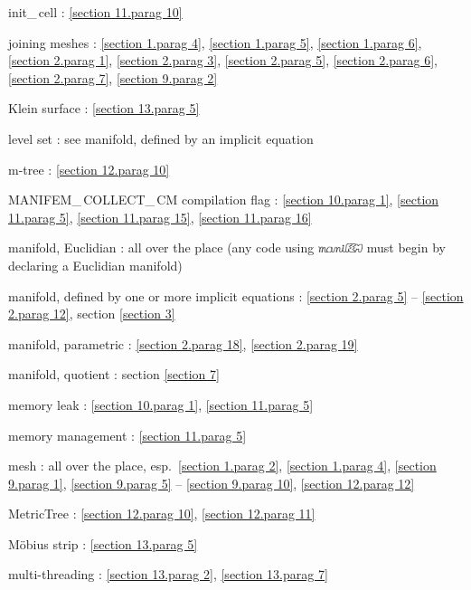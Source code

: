 \documentclass[a4paper]{scrreprt}
\def\numb{}
\newcommand\maniFEM{\leavevmode\hbox{\includegraphics[width=13mm]{manifem-small}}}
\newcommand\verm[1]{\textcolor{manif}{#1}}
\renewcommand\tt{\normalfont\ttfamily}
\begin{document}
\noindent
{\small\tt init\_\,cell} : \ref{\numb section 11.\numb parag 10}

\noindent
{\small\tt join}ing meshes : \ref{\numb section 1.\numb parag 4},
\ref{\numb section 1.\numb parag 5}, \ref{\numb section 1.\numb parag 6},
\ref{\numb section 2.\numb parag 1}, \ref{\numb section 2.\numb parag 3},
\ref{\numb section 2.\numb parag 5}, \ref{\numb section 2.\numb parag 6},
\ref{\numb section 2.\numb parag 7}, \ref{\numb section 9.\numb parag 2}

\noindent
Klein surface : \ref{\numb section 13.\numb parag 5}

\noindent
level set : see manifold, defined by an implicit equation

\noindent
m-tree : \ref{\numb section 12.\numb parag 10}

\noindent
{\small\tt MANIFEM\_\,COLLECT\_\,CM} compilation flag : \ref{\numb section 10.\numb parag 1},
\ref{\numb section 11.\numb parag 5}, \ref{\numb section 11.\numb parag 15},
\ref{\numb section 11.\numb parag 16}

\noindent
manifold, Euclidian : all over the place\hfil\break
\hglue 9mm (any code using {\maniFEM} must begin by declaring a Euclidian manifold)

\noindent
manifold, defined by one or more implicit equations :
\ref{\numb section 2.\numb parag 5} -- \ref{\numb section 2.\numb parag 12},
section \ref{\numb section 3}

\noindent
manifold, parametric : \ref{\numb section 2.\numb parag 18},
\ref{\numb section 2.\numb parag 19}

\noindent
manifold, quotient : section \ref{\numb section 7}

\noindent
memory leak : \ref{\numb section 10.\numb parag 1}, \ref{\numb section 11.\numb parag 5}

\noindent
memory management : \ref{\numb section 11.\numb parag 5}

\noindent
mesh : all over the place, esp.\ \ref{\numb section 1.\numb parag 2},
\ref{\numb section 1.\numb parag 4}, \ref{\numb section 9.\numb parag 1},
\ref{\numb section 9.\numb parag 5} -- \ref{\numb section 9.\numb parag 10},
\ref{\numb section 12.\numb parag 12}

\noindent
{\small\tt \verm{MetricTree}} : \ref{\numb section 12.\numb parag 10},
\ref{\numb section 12.\numb parag 11}

\noindent
M\"obius strip : \ref{\numb section 13.\numb parag 5}

\noindent
multi-threading : \ref{\numb section 13.\numb parag 2}, \ref{\numb section 13.\numb parag 7}
\end{document}
